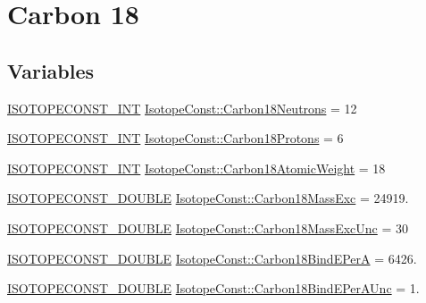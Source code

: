 \hypertarget{group___isotope_const-_carbon-_c18}{}\section{Carbon 18}
\label{group___isotope_const-_carbon-_c18}
\subsection*{Variables}
\begin{DoxyCompactItemize}
\item 
\mbox{\hyperlink{group___isotope_const-_macros_ga5f18360b3e99483a35c32d789e62621c}{I\+S\+O\+T\+O\+P\+E\+C\+O\+N\+S\+T\+\_\+\+I\+NT}} \mbox{\hyperlink{group___isotope_const-_carbon-_c18_ga49db68de5e047d300079058251056d16}{Isotope\+Const\+::\+Carbon18\+Neutrons}} = 12
\item 
\mbox{\hyperlink{group___isotope_const-_macros_ga5f18360b3e99483a35c32d789e62621c}{I\+S\+O\+T\+O\+P\+E\+C\+O\+N\+S\+T\+\_\+\+I\+NT}} \mbox{\hyperlink{group___isotope_const-_carbon-_c18_ga6cc10e53c8da9e78dc0beb65dce0644b}{Isotope\+Const\+::\+Carbon18\+Protons}} = 6
\item 
\mbox{\hyperlink{group___isotope_const-_macros_ga5f18360b3e99483a35c32d789e62621c}{I\+S\+O\+T\+O\+P\+E\+C\+O\+N\+S\+T\+\_\+\+I\+NT}} \mbox{\hyperlink{group___isotope_const-_carbon-_c18_ga2e466070d27dafffbe96f69a9a19921d}{Isotope\+Const\+::\+Carbon18\+Atomic\+Weight}} = 18
\item 
\mbox{\hyperlink{group___isotope_const-_macros_ga8f45a7272ce02c0b4c65c44636ed719a}{I\+S\+O\+T\+O\+P\+E\+C\+O\+N\+S\+T\+\_\+\+D\+O\+U\+B\+LE}} \mbox{\hyperlink{group___isotope_const-_carbon-_c18_ga7ea7cda1dcbb60278fc3dffa5edd1b77}{Isotope\+Const\+::\+Carbon18\+Mass\+Exc}} = 24919.
\item 
\mbox{\hyperlink{group___isotope_const-_macros_ga8f45a7272ce02c0b4c65c44636ed719a}{I\+S\+O\+T\+O\+P\+E\+C\+O\+N\+S\+T\+\_\+\+D\+O\+U\+B\+LE}} \mbox{\hyperlink{group___isotope_const-_carbon-_c18_ga8b13a46baad00c90bce342eebc97c3de}{Isotope\+Const\+::\+Carbon18\+Mass\+Exc\+Unc}} = 30
\item 
\mbox{\hyperlink{group___isotope_const-_macros_ga8f45a7272ce02c0b4c65c44636ed719a}{I\+S\+O\+T\+O\+P\+E\+C\+O\+N\+S\+T\+\_\+\+D\+O\+U\+B\+LE}} \mbox{\hyperlink{group___isotope_const-_carbon-_c18_gac554f1749e39cd71aafda7eec9412b0e}{Isotope\+Const\+::\+Carbon18\+Bind\+E\+PerA}} = 6426.
\item 
\mbox{\hyperlink{group___isotope_const-_macros_ga8f45a7272ce02c0b4c65c44636ed719a}{I\+S\+O\+T\+O\+P\+E\+C\+O\+N\+S\+T\+\_\+\+D\+O\+U\+B\+LE}} \mbox{\hyperlink{group___isotope_const-_carbon-_c18_ga57917a5030b525126ce3cade61f79910}{Isotope\+Const\+::\+Carbon18\+Bind\+E\+Per\+A\+Unc}} = 1.

\end{DoxyCompactItemize}
